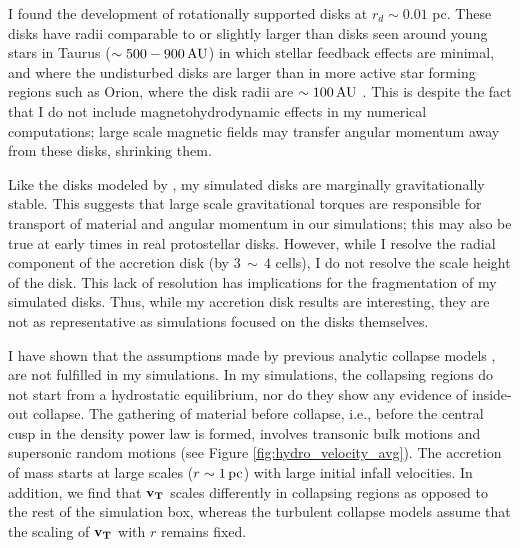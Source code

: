\documentclass[../dissertation.tex]{subfiles}
\begin{document}
I found the development of rotationally supported disks at $r_d \sim 0.01$ pc.  
These disks have radii comparable to or slightly larger than disks seen around 
young stars in Taurus ($\sim 500 - 900\,\rm AU$) \citep{1999AJ....117.1490P} in which stellar feedback effects are minimal,
and where the undisturbed disks are larger than in more active star forming regions such as Orion, 
where the disk radii are $\sim 100\,\rm AU$ \citep{2011ARA&A..49...67W}.  
This is despite the fact that I do not include magnetohydrodynamic effects 
in my numerical computations; large scale magnetic fields may transfer angular 
momentum away from these disks, shrinking them.  

Like the disks modeled by \citet{2010ApJ...708.1585K},
my simulated disks are marginally gravitationally stable.  
This suggests that large scale gravitational torques are responsible for transport of material and angular momentum in our simulations; this may
also be true at early times in real protostellar disks. 
However, while I resolve the radial component of the accretion disk (by $3 \, \sim \, 4$ cells), I do not resolve the scale height of the disk. 
This lack of resolution has implications for the fragmentation of my simulated disks.
Thus, while my accretion disk results are interesting, they are not as representative as simulations focused on the disks themselves.

I have shown that the assumptions made by previous analytic collapse models
\citep{1977ApJ...214..488S,1992ApJ...396..631M,1997ApJ...476..750M,2003ApJ...585..850M}, 
are not fulfilled in my simulations. 
In my simulations, the collapsing regions do not start from a hydrostatic equilibrium, nor 
do they show any evidence of inside-out collapse. 
The gathering of material before collapse, i.e.,
before the central cusp in the density power law is formed, involves transonic bulk motions 
and supersonic random motions (see Figure \ref{fig:hydro_velocity_avg}). 
The accretion of mass starts at large scales ($r\sim 1\,\rm pc$) with large initial infall velocities. 
In addition, we find that $\mathbf{v_T}$ 
scales differently in collapsing regions as opposed to the rest of the simulation box, 
whereas the turbulent collapse models \citep{1997ApJ...476..750M,2003ApJ...585..850M} assume 
that the scaling of $\mathbf{v_T}$ with $r$ remains fixed.  
\end{document}
